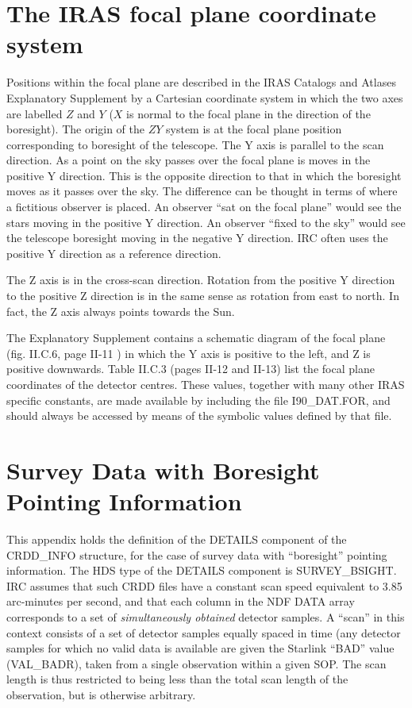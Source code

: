 \section {The IRAS focal plane coordinate system}
\label{APP:FOCALP}
Positions within the focal plane are described in the IRAS Catalogs and Atlases 
Explanatory Supplement by a Cartesian coordinate system in which the two axes
are labelled $Z$ and $Y$ ($X$ is normal to the focal plane in the direction of 
the boresight). The origin of the $ZY$ system is at the focal plane position
corresponding to boresight of the telescope. The Y axis is parallel to the scan 
direction. As a point on the sky passes over the focal plane is moves in the
positive Y direction. This is the opposite direction to that in which the 
boresight moves as it passes over the sky. The difference can be thought in 
terms of where a fictitious observer is placed. An observer ``sat on the focal 
plane'' would see the stars moving in the positive Y direction. An observer
``fixed to the sky'' would see the telescope boresight moving in the negative
Y direction. IRC often uses the positive Y direction as a reference direction.

The Z axis is in the cross-scan direction. Rotation from the positive Y 
direction to the positive Z direction is in the same sense as rotation from
east to north. In fact, the Z axis always points towards the Sun.

The Explanatory Supplement contains a schematic diagram of the focal plane (fig.
 II.C.6, page II-11 ) in which the Y axis is positive to the left, and Z is
positive downwards. Table II.C.3 (pages II-12 and II-13) list the focal plane
coordinates of the detector centres. These values, together with many other IRAS
specific constants, are made available by including the file I90\_DAT.FOR, and
should always be accessed by means of the symbolic values defined by that file. 

\section {Survey Data with Boresight Pointing Information}

This appendix holds the definition of the DETAILS component of the CRDD\_INFO
structure, for the case of survey data with ``boresight'' pointing information.
The HDS type of the DETAILS component is SURVEY\_BSIGHT. IRC assumes that such
CRDD files have a constant scan speed equivalent to 3.85 arc-minutes per second,
and that each column in the NDF DATA array corresponds to a set of {\em
simultaneously obtained} detector samples. A ``scan'' in this context consists
of a set of detector samples equally spaced in time (any detector samples for
which no valid data is available are given the Starlink ``BAD'' value
(VAL\_BADR), taken from a single observation within a given SOP. The scan length
is thus restricted to being less than the total scan length of the observation, 
but is otherwise arbitrary.

